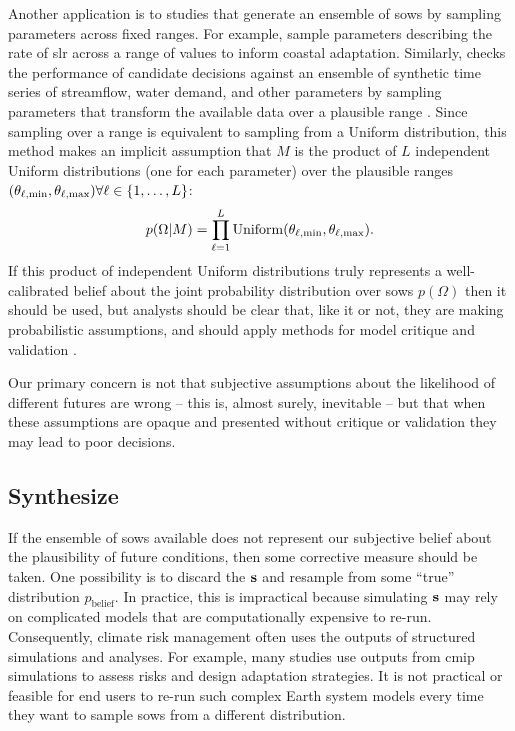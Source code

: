 \documentclass[11pt]{article}
\makeatletter
\newcommand{\james}[1]{\todo[color=giallo, textcolor=nero]{\textbf{ATTN James:~}#1}} %
\DeclareRobustCommand\onedot{\futurelet\@let@token\@onedot}
\def\@onedot{\ifx\@let@token.\else.\null\fi\xspace}
\def\ie{\emph{i.e}\onedot} \def\Ie{\emph{I.e}\onedot}
\DeclareRobustCommand\onedot{\futurelet\@let@token\@onedot}
\def\@onedot{\ifx\@let@token.\else.\null\fi\xspace}
\def\ie{\emph{i.e}\onedot} \def\Ie{\emph{I.e}\onedot}
\makeatother
\begin{document}
Another application is to studies that generate an ensemble of \glspl{sow} by sampling parameters across fixed ranges.
For example, \citet{lempert_slr:2012} sample parameters describing the rate of \gls{slr} across a range of values to inform coastal adaptation.
Similarly, \citet{trindade_waterpathways:2020} checks the performance of candidate decisions against an ensemble of synthetic time series of streamflow, water demand, and other parameters by sampling parameters that transform the available data over a plausible range \citep[\ie, calculating robustness metrics; see][for details]{mcphail_robustness:2019,herman:2015}.
Since sampling over a range is equivalent to sampling from a Uniform distribution, this method makes an implicit assumption that $M$ is the product of $L$ independent Uniform distributions (one for each parameter) over the plausible ranges $\qty(\theta_{\ell,\min}, \theta_{\ell,\max}) \forall \ell \in \qty{1, \ldots, L}$:
\begin{equation}
    p(\Omega | M) = \prod_{\ell=1}^L \mathrm{Uniform} \qty(\theta_{\ell,\min}, \theta_{\ell,\max}).
\end{equation}
If this product of independent Uniform distributions truly represents a well-calibrated belief about the joint probability distribution over \glspl{sow} $p(\Omega)$ then it should be used, but analysts should be clear that, like it or not, they are making probabilistic assumptions, and should apply methods for model critique and validation \citep[see][]{gelman_workflow:2020}.

Our primary concern is not that subjective assumptions about the likelihood of different futures are wrong -- this is, almost surely, inevitable -- but that when these assumptions are opaque and presented without critique or validation they may lead to poor decisions.

\subsection{Synthesize}\label{sec:analysis-synthesize}

If the ensemble of \glspl{sow} available does not represent our subjective belief about the plausibility of future conditions, then some corrective measure should be taken.
One possibility is to discard the $\vb{s}$ and resample from some ``true'' distribution $p_\mathrm{belief}$.
In practice, this is impractical because simulating $\vb{s}$ may rely on complicated models that are computationally expensive to re-run.
Consequently, climate risk management often uses the outputs of structured simulations and analyses.
For example, many studies use outputs from \gls{cmip} simulations \citep{meehl_cmip:2000} to assess risks and design adaptation strategies.\james{Add some refs}
It is not practical or feasible for end users to re-run such complex Earth system models every time they want to sample \glspl{sow} from a different distribution.
\end{document}
